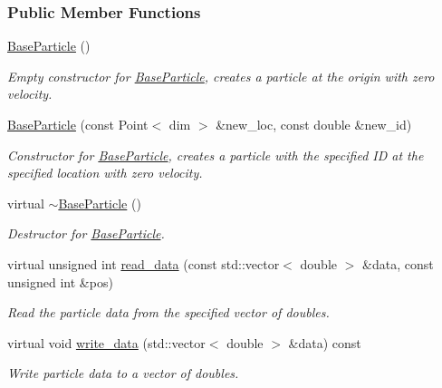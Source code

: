 \subsubsection*{Public Member Functions}
\begin{DoxyCompactItemize}
\item 
\hyperlink{classps__mmm_1_1_particle_1_1_base_particle_a79477d4c34fac56cd9dadeeb5442e3f6}{Base\+Particle} ()
\begin{DoxyCompactList}\small\item\em Empty constructor for \hyperlink{classps__mmm_1_1_particle_1_1_base_particle}{Base\+Particle}, creates a particle at the origin with zero velocity. \end{DoxyCompactList}\item 
\hyperlink{classps__mmm_1_1_particle_1_1_base_particle_aa0ed5ffa5b37e832150acd4b5e1739ba}{Base\+Particle} (const Point$<$ dim $>$ \&new\+\_\+loc, const double \&new\+\_\+id)
\begin{DoxyCompactList}\small\item\em Constructor for \hyperlink{classps__mmm_1_1_particle_1_1_base_particle}{Base\+Particle}, creates a particle with the specified I\+D at the specified location with zero velocity. \end{DoxyCompactList}\item 
virtual \hyperlink{classps__mmm_1_1_particle_1_1_base_particle_afd0a5b9a268811e882b414ce9fb9b4aa}{$\sim$\+Base\+Particle} ()
\begin{DoxyCompactList}\small\item\em Destructor for \hyperlink{classps__mmm_1_1_particle_1_1_base_particle}{Base\+Particle}. \end{DoxyCompactList}\item 
virtual unsigned int \hyperlink{classps__mmm_1_1_particle_1_1_base_particle_a0f9e2660b33720e1b844065f550cdeb6}{read\+\_\+data} (const std\+::vector$<$ double $>$ \&data, const unsigned int \&pos)
\begin{DoxyCompactList}\small\item\em Read the particle data from the specified vector of doubles. \end{DoxyCompactList}\item 
virtual void \hyperlink{classps__mmm_1_1_particle_1_1_base_particle_adf914588cac73912da61672d00917224}{write\+\_\+data} (std\+::vector$<$ double $>$ \&data) const 
\begin{DoxyCompactList}\small\item\em Write particle data to a vector of doubles. \end{DoxyCompactList}\item 

\end{DoxyCompactItemize}
